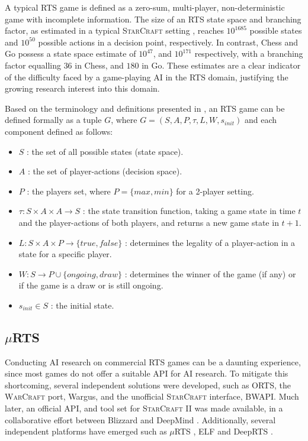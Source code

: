\documentclass[conference]{IEEEtran}
\newcommand{\mRTS}{$\mu$RTS}
\begin{document}
A typical RTS game is defined as a zero-sum, multi-player, non-deterministic game with incomplete information. The size of an RTS state space and branching factor, as estimated in a typical \textsc{StarCraft} setting \cite{ontanon_survey_2013}, reaches $10^{1685}$ possible states and $10^{50}$ possible actions in a decision point, respectively. In contrast, Chess and Go possess a state space estimate of $10^{47}$, and $10^{171}$ respectively, with a branching factor equalling $36$ in Chess, and $180$ in Go. These estimates are a clear indicator of the difficulty faced by a game-playing AI in the RTS domain, justifying the growing research interest into this domain.

Based on the terminology and definitions presented in \cite{ontanon_combinatorial_2017}, an RTS game can be defined formally as a tuple $G$, where $G = (S, A, P, \tau, L, W, s_{init})$ and each component defined as follows:

\begin{itemize}
\item $S$ : the set of all possible states (state space).
\item $A$ : the set of player-actions (decision space).
\item $P$ : the players set, where $P=\{max,min\}$ for a 2-player setting.
\item $\tau : S \times A \times A \rightarrow S$ : the state transition function, taking a game state in time $t$ and the player-actions of both players, and returns a new game state in $t+1$.
\item $L: S \times A \times P \rightarrow \{true,false\}$ : determines the legality of a player-action in a state for a specific player.
\item $W: S \rightarrow P \cup \{ongoing,draw\}$ : determines the winner of the game (if any) or if the game is a draw or is still ongoing.
\item $s_{init} \in S$ : the initial state.
\end{itemize}


\subsection{\mRTS{}}

Conducting AI research on commercial RTS games can be a daunting experience, since most games do not offer a suitable API for AI research. To mitigate this shortcoming, several independent solutions were developed, such as ORTS, the \textsc{WarCraft} port, Wargus, and the unofficial \textsc{StarCraft} interface, BWAPI. Much later, an official API, and tool set for \textsc{StarCraft II} was made available, in a collaborative effort between Blizzard and DeepMind \cite{vinyals_starcraft_2017-1}. Additionally, several independent platforms have emerged such as \mRTS{} \cite{ontanon_combinatorial_2013}, ELF \cite{tian_elf_2017} and DeepRTS \cite{andersen_deep_2018}.
\end{document}
